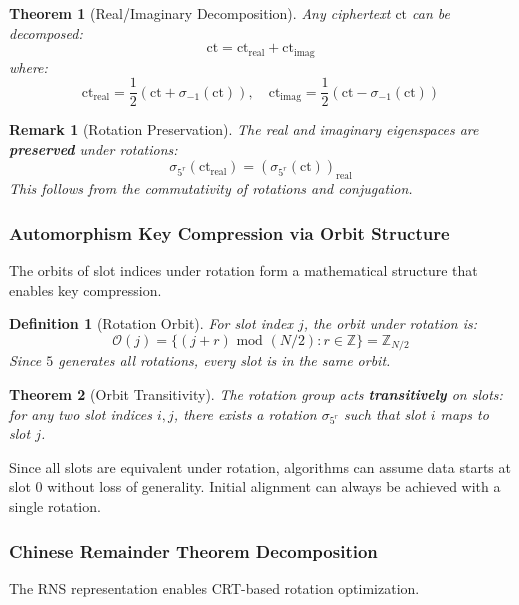 \documentclass[11pt,a4paper]{article}
\newtheorem{definition}{Definition}
\newtheorem{theorem}{Theorem}
\newtheorem{remark}{Remark}
\newcommand{\Z}{\mathbb{Z}}
\newcommand{\bmod}{\text{ mod }}
\begin{document}
\begin{theorem}[Real/Imaginary Decomposition]
Any ciphertext $\text{ct}$ can be decomposed:
\[
\text{ct} = \text{ct}_{\text{real}} + \text{ct}_{\text{imag}}
\]
where:
\[
\text{ct}_{\text{real}} = \frac{1}{2}(\text{ct} + \sigma_{-1}(\text{ct})), \quad \text{ct}_{\text{imag}} = \frac{1}{2}(\text{ct} - \sigma_{-1}(\text{ct}))
\]
\end{theorem}

\begin{remark}[Rotation Preservation]
The real and imaginary eigenspaces are \textbf{preserved} under rotations:
\[
\sigma_{5^r}(\text{ct}_{\text{real}}) = (\sigma_{5^r}(\text{ct}))_{\text{real}}
\]
This follows from the commutativity of rotations and conjugation.
\end{remark}

\subsubsection{Automorphism Key Compression via Orbit Structure}

The orbits of slot indices under rotation form a mathematical structure that enables key compression.

\begin{definition}[Rotation Orbit]
For slot index $j$, the orbit under rotation is:
\[
\mathcal{O}(j) = \{ (j + r) \bmod (N/2) : r \in \Z \} = \Z_{N/2}
\]
Since $5$ generates all rotations, every slot is in the same orbit.
\end{definition}

\begin{theorem}[Orbit Transitivity]
The rotation group acts \textbf{transitively} on slots: for any two slot indices $i, j$, there exists a rotation $\sigma_{5^r}$ such that slot $i$ maps to slot $j$.
\end{theorem}

\begin{corollary}
Since all slots are equivalent under rotation, algorithms can assume data starts at slot 0 without loss of generality. Initial alignment can always be achieved with a single rotation.
\end{corollary}

\subsubsection{Chinese Remainder Theorem Decomposition}

The RNS representation enables CRT-based rotation optimization.
\end{document}
